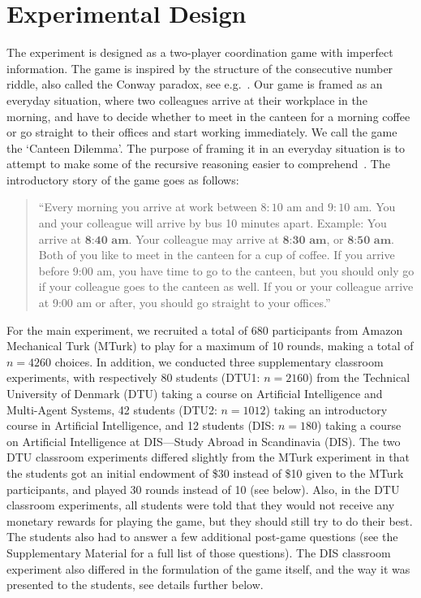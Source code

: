 \documentclass[twocolumn,a4paper,superscriptaddress,nofootinbib]{revtex4}
\begin{document}
\section{Experimental Design}\label{sect:experimental_design} 
The experiment is designed as a two-player coordination game with imperfect information. The game is inspired by the structure of the consecutive number riddle, also called the Conway paradox, see e.g.\ \citet{van1980conway,van2015one}. Our game is framed as an everyday situation, where two colleagues arrive at their workplace in the morning, and have to decide whether to meet in the canteen for a morning coffee or go straight to their offices and start working immediately. We call the game the `Canteen Dilemma'. The purpose of framing it in an everyday situation is to attempt to make some of the recursive reasoning easier to comprehend~\citep{meijering2010facilitative, wason1971natural}. The introductory story of the game goes as follows:
\begin{quote}
\indent
``Every morning you arrive at work between $8{:}10$ am and $9{:}10$ am. You and your colleague will arrive by bus 10 minutes apart. Example: You arrive at $\textbf{8:40 am}$. Your colleague may arrive at $\textbf{8:30  am}$, or $\textbf{8:50 am}$. Both of you like to meet in the canteen for a cup of coffee. If you arrive before 9:00 am, you have time to go to the canteen, but you should only go if your colleague goes to the canteen as well. If you or your colleague arrive at 9:00 am or after, you should go straight to your offices.''
\end{quote}
For the main experiment, we recruited a total of 680 participants from Amazon Mechanical Turk (MTurk) to play for a maximum of 10 rounds, making a total of $n=4260$ choices. In addition, we conducted three supplementary classroom experiments, with  respectively 80 students (DTU1: $n=2160$) from the Technical University of Denmark (DTU) taking a course on Artificial Intelligence and Multi-Agent Systems, 42 students (DTU2: $n=1012$) taking an introductory course in Artificial Intelligence, and 12 students (DIS: $n=180$) taking a course on Artificial Intelligence at DIS---Study Abroad in Scandinavia (DIS). The two DTU classroom experiments differed slightly from the MTurk experiment in that the students got an initial endowment of \$30 instead of \$10 given to the MTurk participants, and played 30 rounds instead of 10 (see below). Also, in the DTU classroom experiments, all students were told that they would not receive any monetary rewards for playing the game, but they should still try to do their best. The students also had to answer a few additional post-game questions (see the Supplementary Material for a full list of those questions). The DIS classroom experiment also differed in the formulation of the game itself, and the way it was presented to the students, see details further below. 
\end{document}
